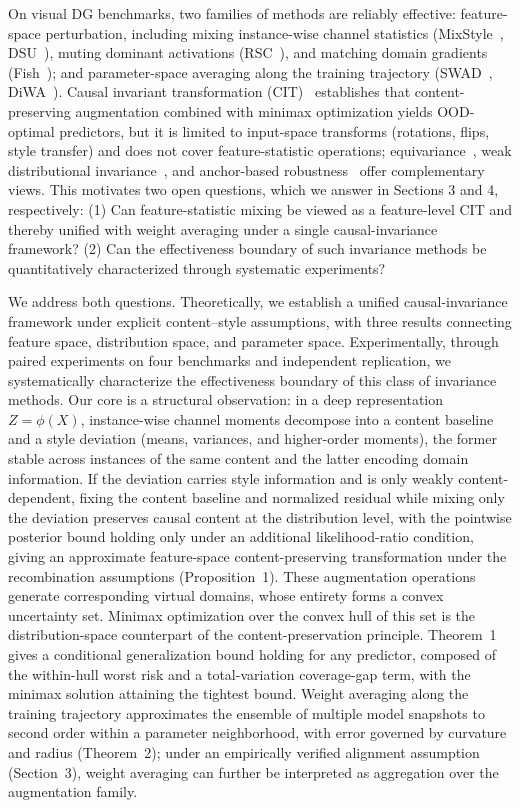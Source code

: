 \documentclass[electronics,article,submit,moreauthors]{Definitions/mdpi}
\newcommand{\add}[1]{\textcolor{addblue}{#1}}
\newcommand{\del}[1]{\textcolor{delred}{\st{#1}}}
\def\add#1{#1}%
\def\del#1{}%
\renewcommand{\add}[1]{#1}
\renewcommand{\del}[1]{}
\begin{document}
On visual DG benchmarks, two families of methods are reliably effective: feature-space perturbation, including mixing instance-wise channel statistics (MixStyle~\citep{ref14}, DSU~\citep{ref15}), muting dominant activations (RSC~\citep{ref16}), and matching domain gradients (Fish~\citep{ref17}); and parameter-space averaging along the training trajectory (SWAD~\citep{ref18}, DiWA~\citep{ref19}). Causal invariant transformation (CIT)~\citep{ref22} establishes that content-preserving augmentation combined with minimax optimization yields OOD-optimal predictors, but it is limited to input-space transforms (rotations, flips, style transfer) and does not cover feature-statistic operations; equivariance~\citep{ref23}, weak distributional invariance~\citep{ref24}, and anchor-based robustness~\citep{ref25} offer complementary views. This motivates two open questions, which we answer in Sections 3 and 4, respectively: (1) Can feature-statistic mixing be viewed as a feature-level CIT and thereby unified with weight averaging under a single causal-invariance framework? (2) Can the effectiveness boundary of such invariance methods be quantitatively characterized through systematic experiments?

We address both questions. Theoretically, we establish a unified causal-invariance framework under explicit content--style assumptions, with three results connecting feature space, distribution space, and parameter space. Experimentally, through paired experiments on four benchmarks and independent replication, we systematically characterize the effectiveness boundary of this class of invariance methods. Our core is a structural observation: in a deep representation $Z=\phi(X)$, instance-wise channel moments decompose into a content baseline and a style deviation (means, variances, and higher-order moments), the former stable across instances of the same content and the latter encoding domain information. If the deviation carries style information and is only weakly content-dependent, fixing the content baseline and normalized residual while mixing only the deviation preserves causal content at the distribution level, with the pointwise posterior bound holding only under an additional likelihood-ratio condition, giving an approximate feature-space content-preserving transformation under the recombination assumptions (Proposition~1). These augmentation operations generate corresponding virtual domains, whose entirety forms a convex uncertainty set. Minimax optimization over the convex hull of this set is the distribution-space counterpart of the content-preservation principle. Theorem~1 gives a conditional generalization bound holding for any predictor, composed of the within-hull worst risk and a total-variation coverage-gap term, with the minimax solution attaining the tightest bound. Weight averaging along the training trajectory approximates the ensemble of multiple model snapshots to second order within a parameter neighborhood, with error governed by curvature and radius (Theorem~2); \del{under an alignment assumption,}\add{under an empirically verified alignment assumption (Section~3),} weight averaging can further be interpreted as aggregation over the augmentation family.
\end{document}
